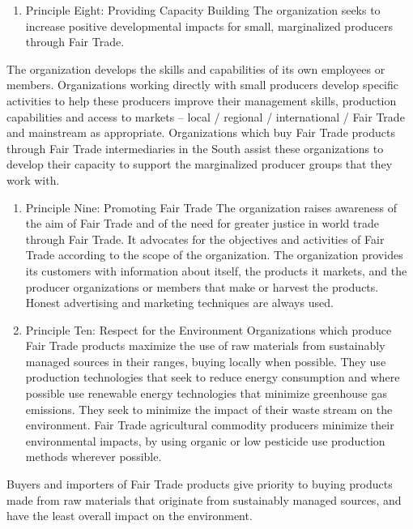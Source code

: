 \documentclass[]{book}
\providecommand{\tightlist}{%
  \setlength{\itemsep}{0pt}\setlength{\parskip}{0pt}}
\begin{document}
\begin{enumerate}
\def\labelenumi{\arabic{enumi}.}
\setcounter{enumi}{7}
\tightlist
\item
  Principle Eight: Providing Capacity Building
  The organization seeks to increase positive developmental impacts for small, marginalized producers through Fair Trade.
\end{enumerate}

The organization develops the skills and capabilities of its own employees or members. Organizations working directly with small producers develop specific activities to help these producers improve their management skills, production capabilities and access to markets -- local / regional / international / Fair Trade and mainstream as appropriate. Organizations which buy Fair Trade products through Fair Trade intermediaries in the South assist these organizations to develop their capacity to support the marginalized producer groups that they work with.

\begin{enumerate}
\def\labelenumi{\arabic{enumi}.}
\setcounter{enumi}{8}
\item
  Principle Nine: Promoting Fair Trade
  The organization raises awareness of the aim of Fair Trade and of the need for greater justice in world trade through Fair Trade. It advocates for the objectives and activities of Fair Trade according to the scope of the organization. The organization provides its customers with information about itself, the products it markets, and the producer organizations or members that make or harvest the products. Honest advertising and marketing techniques are always used.
\item
  Principle Ten: Respect for the Environment
  Organizations which produce Fair Trade products maximize the use of raw materials from sustainably managed sources in their ranges, buying locally when possible. They use production technologies that seek to reduce energy consumption and where possible use renewable energy technologies that minimize greenhouse gas emissions. They seek to minimize the impact of their waste stream on the environment. Fair Trade agricultural commodity producers minimize their environmental impacts, by using organic or low pesticide use production methods wherever possible.
\end{enumerate}

Buyers and importers of Fair Trade products give priority to buying products made from raw materials that originate from sustainably managed sources, and have the least overall impact on the environment.
\end{document}
